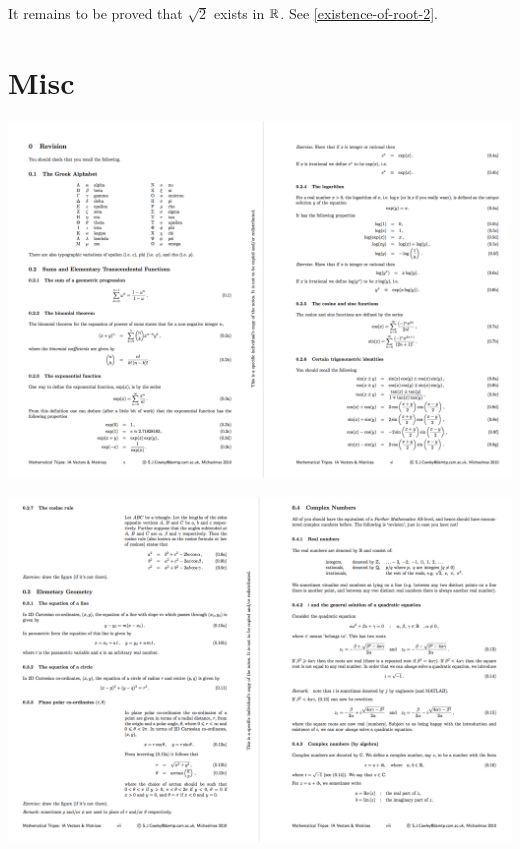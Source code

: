 \begin{remark*}
  It remains to be proved that $\sqrt{2}$ exists in $\mathbb{R}$. See \ref{existence-of-root-2}.
\end{remark*}

\section{Misc}
\begin{mdframed}
  \includegraphics[width=400pt]{img/misc--cambridge-1a-vectors-and-matrices-revision-1.png}
\end{mdframed}
\begin{mdframed}
  \includegraphics[width=400pt]{img/misc--cambridge-1a-vectors-and-matrices-revision-2.png}
\end{mdframed}
